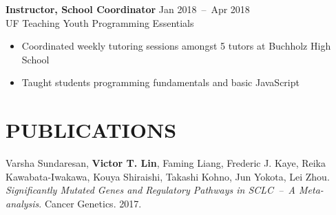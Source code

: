\documentclass[line,resmargin]{res}
\begin{document}
\begin{resume}
    \textbf{Instructor, School Coordinator}    \hfill Jan 2018~--~Apr 2018 \\
    UF Teaching Youth Programming Essentials
    \begin{itemize}  \itemsep -2pt
        \item Coordinated weekly tutoring sessions amongst 5 tutors at Buchholz High School
        \item Taught students programming fundamentals and basic JavaScript
    \end{itemize}

\section{PUBLICATIONS}
    Varsha Sundaresan, \textbf{Victor T. Lin}, Faming Liang, Frederic J. Kaye, Reika Kawabata-Iwakawa, Kouya Shiraishi, Takashi Kohno, Jun Yokota, Lei Zhou.
    \textit{Significantly Mutated Genes and Regulatory Pathways in SCLC~--~A Meta-analysis}. Cancer Genetics. 2017.

\end{resume}
\end{document}
